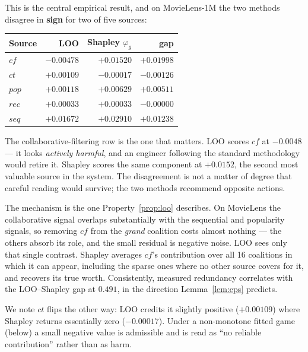 \documentclass[11pt]{article}
\begin{document}
This is the central empirical result, and on MovieLens-1M the two methods
disagree in \textbf{sign} for two of five sources:

\begin{center}\footnotesize
\begin{tabular}{lrrr}
\toprule
Source & LOO & Shapley $\varphi_g$ & gap \\
\midrule
$cf$  & $-0.00478$ & $+0.01520$ & $+0.01998$ \\
$ct$  & $+0.00109$ & $-0.00017$ & $-0.00126$ \\
$pop$ & $+0.00118$ & $+0.00629$ & $+0.00511$ \\
$rec$ & $+0.00033$ & $+0.00033$ & $-0.00000$ \\
$seq$ & $+0.01672$ & $+0.02910$ & $+0.01238$ \\
\bottomrule
\end{tabular}
\end{center}

\noindent
The collaborative-filtering row is the one that matters. LOO scores $cf$ at
$-0.0048$ --- it looks \emph{actively harmful}, and an engineer following the
standard methodology would retire it. Shapley scores the same component
at $+0.0152$, the second most valuable source in the system. The disagreement
is not a matter of degree that careful reading would survive; the two methods
recommend opposite actions.

The mechanism is the one Property~\ref{prop:loo} describes. On MovieLens the
collaborative signal overlaps substantially with the sequential and popularity
signals, so removing $cf$ from the \emph{grand} coalition costs almost nothing
--- the others absorb its role, and the small residual is negative noise. LOO
sees only that single contrast. Shapley averages $cf$'s contribution over all
16 coalitions in which it can appear, including the sparse ones where no other
source covers for it, and recovers its true worth. Consistently, measured
redundancy correlates with the LOO--Shapley gap at $0.491$, in the direction
Lemma~\ref{lem:eps} predicts.

We note $ct$ flips the other way: LOO credits it slightly positive
($+0.00109$) where Shapley returns essentially zero ($-0.00017$). Under a
non-monotone fitted game (below) a small negative value is admissible and is
read as ``no reliable contribution'' rather than as harm.




\end{document}
